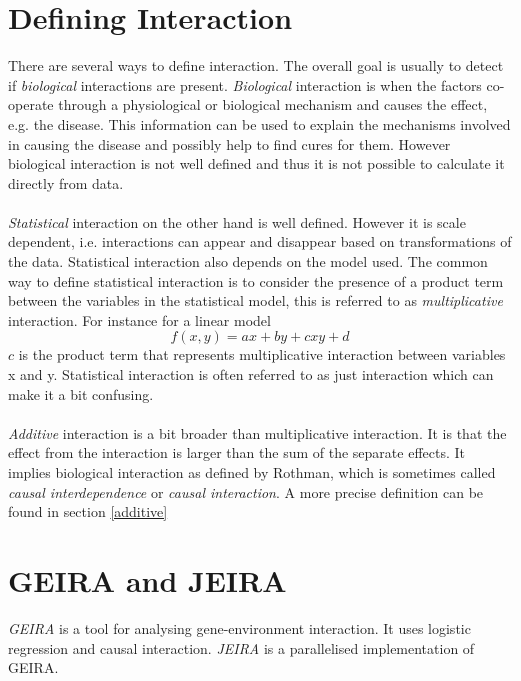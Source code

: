 \documentclass[10pt,a4paper]{report}
\begin{document}
\section{Defining Interaction}
There are several ways to define interaction. The overall goal is usually to detect if \emph{biological} interactions are present. \emph{Biological} interaction is when the factors co-operate through a physiological or biological mechanism and causes the effect, e.g. the disease. This information can be used to explain the mechanisms involved in causing the disease and possibly help to find cures for them. However biological interaction is not well defined and thus it is not possible to calculate it directly from data.\cite{rothman1998modern,rothman2002intro_epidemiology}\\
\\
\emph{Statistical} interaction on the other hand is well defined. However it is scale dependent, i.e. interactions can appear and disappear based on transformations of the data. Statistical interaction also depends on the model used. The common way to define statistical interaction is to consider the presence of a product term between the variables in the statistical model, this is referred to as \emph{multiplicative} interaction. For instance for a linear model
\begin{equation}
f(x,y)=ax+by+cxy+d
\end{equation}
$c$ is the product term that represents multiplicative interaction between variables x and y. Statistical interaction is often referred to as just interaction which can make it a bit confusing.\cite{geira,rothman1998modern}\\
\\
\emph{Additive} interaction is a bit broader than multiplicative interaction. It is that the effect from the interaction is larger than the sum of the separate effects. It implies biological interaction as defined by Rothman, which is sometimes called \emph{causal interdependence} or \emph{causal interaction}. A more precise definition can be found in section \ref{additive}

\section{GEIRA and JEIRA}
\emph{GEIRA} is a tool for analysing gene-environment interaction. It uses logistic regression and causal interaction\cite{geira}. \emph{JEIRA} is a parallelised implementation of GEIRA\cite{uvehag_master_thesis}.
\end{document}
